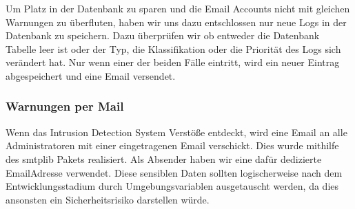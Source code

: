 \documentclass[letterpaper,10pt,ngerman]{sphinxmanual}
\begin{document}
\begin{sphinxVerbatim}[commandchars=\\\{\}]
  
  

     \PYG{p}{[}\PYG{p}{]}    \PYG{p}{[}\PYG{p}{]}    \PYG{p}{[}\PYG{p}{]}  
        
\end{sphinxVerbatim}

Um Platz in der Datenbank zu sparen und die Email Accounts nicht mit gleichen Warnungen zu überfluten, haben wir uns dazu entschlossen nur neue Logs in der Datenbank zu speichern. Dazu überprüfen wir ob entweder die Datenbank Tabelle leer ist oder der Typ, die Klassifikation oder die Priorität des Logs sich verändert hat. Nur wenn einer der beiden Fälle eintritt, wird ein neuer Eintrag abgespeichert und eine Email versendet.


\subsubsection{Warnungen per Mail}
\label{\detokenize{webapp:warnungen-per-mail}}
Wenn das Intrusion Detection System Verstöße entdeckt, wird eine Email an alle Administratoren mit einer eingetragenen Email verschickt. Dies wurde mithilfe des smtplib Pakets realisiert. Als Absender haben wir eine dafür dedizierte Email\sphinxhyphen{}Adresse verwendet. Diese sensiblen Daten sollten logischerweise nach dem Entwicklungsstadium durch Umgebungsvariablen ausgetauscht werden, da dies ansonsten ein Sicherheitsrisiko darstellen würde.
\end{document}

